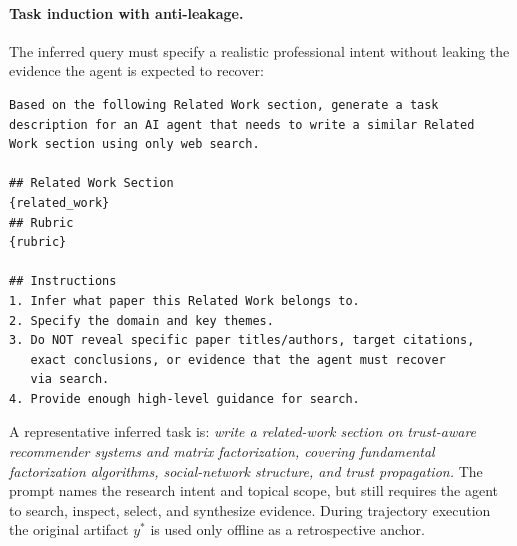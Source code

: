\paragraph{Task induction with anti-leakage.}
The inferred query must specify a realistic professional intent without
leaking the evidence the agent is expected to recover:
\begin{lstlisting}[basicstyle=\ttfamily\scriptsize,breaklines=true]
Based on the following Related Work section, generate a task
description for an AI agent that needs to write a similar Related
Work section using only web search.

## Related Work Section
{related_work}
## Rubric
{rubric}

## Instructions
1. Infer what paper this Related Work belongs to.
2. Specify the domain and key themes.
3. Do NOT reveal specific paper titles/authors, target citations,
   exact conclusions, or evidence that the agent must recover
   via search.
4. Provide enough high-level guidance for search.
\end{lstlisting}
A representative inferred task is: \emph{write a related-work section on
trust-aware recommender systems and matrix factorization, covering
fundamental factorization algorithms, social-network structure, and
trust propagation.} The prompt names the research intent and topical
scope, but still requires the agent to search, inspect, select, and
synthesize evidence. During trajectory execution the original artifact
$y^{*}$ is used only offline as a retrospective anchor.
